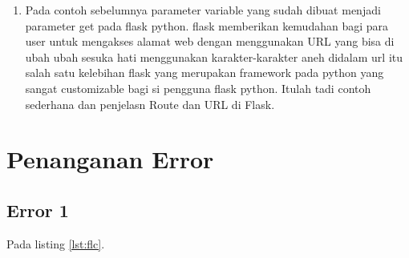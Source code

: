 \begin{enumerate}
\item Pada contoh sebelumnya parameter variable yang sudah dibuat menjadi parameter get pada flask python. flask memberikan kemudahan bagi para user untuk mengakses alamat web dengan menggunakan URL yang bisa di ubah ubah sesuka hati menggunakan karakter-karakter aneh didalam url itu salah satu kelebihan flask yang merupakan framework pada python yang sangat customizable bagi si pengguna flask python.  Itulah tadi contoh sederhana dan penjelasn Route dan URL di Flask.

\end{enumerate}

\section{Penanganan Error}
\subsection{Error 1}
Pada listing \ref{lst:flc}.


